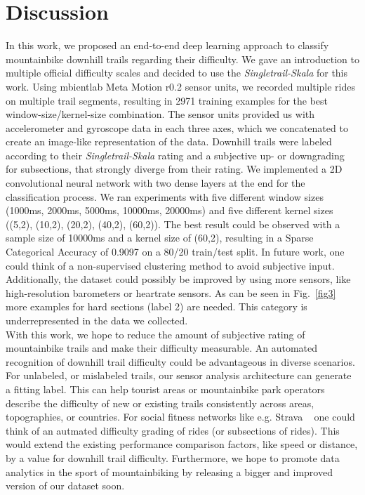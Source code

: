 \documentclass[runningheads]{llncs}
\begin{document}
\section{Discussion}
In this work, we proposed an end-to-end deep learning approach to classify mountainbike downhill trails regarding their difficulty. 
We gave an introduction to multiple official difficulty scales and decided to use the \textit{Singletrail-Skala} for this work.
Using mbientlab Meta Motion r0.2 sensor units, we recorded multiple rides on multiple trail segments, resulting in 2971 training examples for the best window-size/kernel-size combination.
The sensor units provided us with accelerometer and gyroscope data in each three axes, which we concatenated to create an image-like representation of the data.
Downhill trails were labeled according to their \textit{Singletrail-Skala} rating and a subjective up- or downgrading for subsections, that strongly diverge from their rating.
We implemented a 2D convolutional neural network with two dense layers at the end for the classification process.
We ran experiments with five different window sizes (1000ms, 2000ms, 5000ms, 10000ms, 20000ms) and five different kernel sizes ((5,2), (10,2), (20,2), (40,2), (60,2)).
The best result could be observed with a sample size of 10000ms and a kernel size of (60,2), resulting in a Sparse Categorical Accuracy of 0.9097 on a 80/20 train/test split. 
In future work, one could think of a non-supervised clustering method to avoid subjective input.
Additionally, the dataset could possibly be improved by using more sensors, like high-resolution barometers or heartrate sensors.
As can be seen in Fig.~\ref{fig3} more examples for hard sections (label 2) are needed.
This category is underrepresented in the data we collected.
\\
With this work, we hope to reduce the amount of subjective rating of mountainbike trails and make their difficulty measurable.
An automated recognition of downhill trail difficulty could be advantageous in diverse scenarios.
For unlabeled, or mislabeled trails, our sensor analysis architecture can generate a fitting label.
This can help tourist areas or mountainbike park operators describe the difficulty of new or existing trails consistently across areas, topographies, or countries.
For social fitness networks like e.g. Strava ~\cite{strava} one could think of an autmated difficulty grading of rides (or subsections of rides).
This would extend the existing performance comparison factors, like speed or distance, by a value for downhill trail difficulty.
Furthermore, we hope to promote data analytics in the sport of mountainbiking by releasing a bigger and improved version of our dataset soon.




\end{document}
